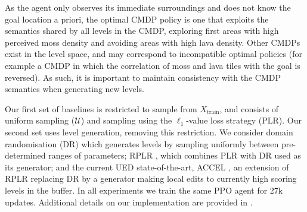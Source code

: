 As the agent only observes its immediate surroundings and does not know the goal location a priori, the optimal CMDP policy is one that exploits the semantics shared by all levels in the CMDP, exploring first areas with high perceived moss density and avoiding areas with high lava density. Other CMDPs exist in the level space, and may correspond to incompatible optimal policies (for example a CMDP in which the correlation of moss and lava tiles with the goal is reversed). As such, it is important to maintain consistency with the CMDP semantics when generating new levels.

Our first set of baselines is restricted to sample from $X_\text{train}$, and consists of uniform sampling ($\mathcal{U}$) and sampling using the $\ell_1$-value loss strategy (PLR). Our second set uses level generation, removing this restriction. We consider domain randomisation (DR) \citep{tobin2017domain} which generates levels by sampling uniformly between pre-determined ranges of parameters; RPLR \citep{Robust-PLR}, which combines PLR with DR used as its generator; and the current UED state-of-the-art, ACCEL \citep{ACCEL}, an extension of RPLR replacing DR by a generator making local edits to currently high scoring levels in the buffer. %
In all experiments we train the same PPO \citep{PPO} agent for 27k updates. Additional details on our implementation are provided in .
